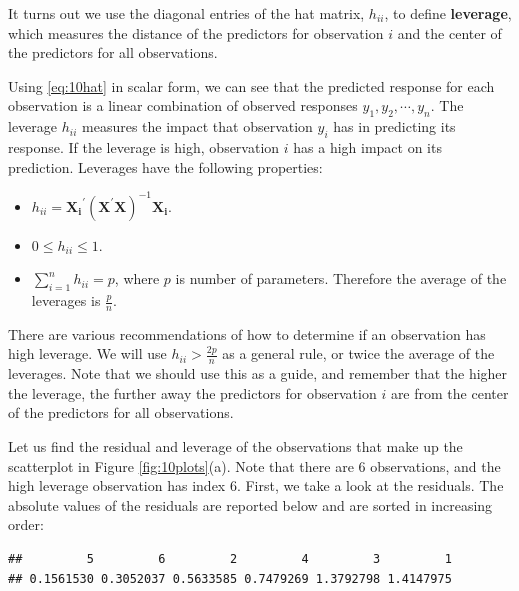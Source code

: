 \documentclass[
]{book}
\newenvironment{Shaded}{\begin{snugshade}}{\end{snugshade}}
\newcommand{\DocumentationTok}[1]{\textcolor[rgb]{0.56,0.35,0.01}{\textbf{\textit{#1}}}}
\newcommand{\FunctionTok}[1]{\textcolor[rgb]{0.13,0.29,0.53}{\textbf{#1}}}
\newcommand{\NormalTok}[1]{#1}
\newcommand{\SpecialCharTok}[1]{\textcolor[rgb]{0.81,0.36,0.00}{\textbf{#1}}}
\providecommand{\tightlist}{%
  \setlength{\itemsep}{0pt}\setlength{\parskip}{0pt}}
\begin{document}
It turns out we use the diagonal entries of the hat matrix, \(h_{ii}\), to define \textbf{leverage}, which measures the distance of the predictors for observation \(i\) and the center of the predictors for all observations.

Using \eqref{eq:10hat} in scalar form, we can see that the predicted response for each observation is a linear combination of observed responses \(y_1, y_2, \cdots, y_n\). The leverage \(h_{ii}\) measures the impact that observation \(y_i\) has in predicting its response. If the leverage is high, observation \(i\) has a high impact on its prediction. Leverages have the following properties:

\begin{itemize}
\tightlist
\item
  \(h_{ii} = \boldsymbol{X_{i}}^{\prime} \left(\boldsymbol{X^{\prime}X} \right)^{-1} \boldsymbol{X_{i}}\).
\item
  \(0\leq h_{ii}\leq 1\).
\item
  \(\sum_{i=1}^n h_{ii}=p\), where \(p\) is number of parameters. Therefore the average of the leverages is \(\frac{p}{n}\).
\end{itemize}

There are various recommendations of how to determine if an observation has high leverage. We will use \(h_{ii} > \frac{2p}{n}\) as a general rule, or twice the average of the leverages. Note that we should use this as a guide, and remember that the higher the leverage, the further away the predictors for observation \(i\) are from the center of the predictors for all observations.

Let us find the residual and leverage of the observations that make up the scatterplot in Figure \ref{fig:10plots}(a). Note that there are 6 observations, and the high leverage observation has index 6. First, we take a look at the residuals. The absolute values of the residuals are reported below and are sorted in increasing order:

\begin{Shaded}
\end{Shaded}

\begin{verbatim}
##         5         6         2         4         3         1 
## 0.1561530 0.3052037 0.5633585 0.7479269 1.3792798 1.4147975
\end{verbatim}
\end{document}
